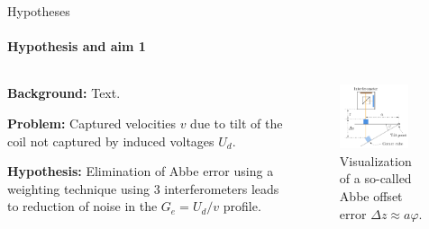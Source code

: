 \documentclass{beamer}
\begin{document}
\begin{frame}[allowframebreaks]{Hypotheses}
  \framesubtitle{Hypothesis and aim 1}

  \begin{columns}
    \begin{column}{0.59\textwidth}
\textbf{Background:} Text.
    
    \textbf{Problem:} Captured velocities $v$ due to tilt of the coil not captured by induced voltages $U_d$.

    \textbf{Hypothesis:} Elimination of Abbe error using a weighting technique using 3 interferometers leads to reduction of noise in the $G_e = U_d/v$ profile.
    \end{column}
    
    \begin{column}{0.4\textwidth}
      \begin{figure}[h!] 
	\centering
	\includegraphics[width=0.8\textwidth]{figures/abbeerror.pdf}
	\caption{Visualization of a so-called Abbe offset error $\Delta z \approx a \varphi$.}
	\label{fig:abbeerror}
      \end{figure}
    \end{column}
  \end{columns}
\end{frame}
\end{document}
